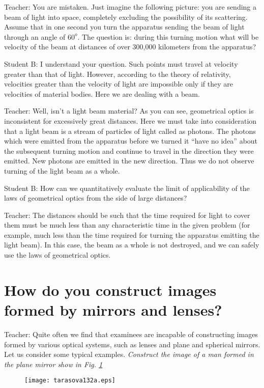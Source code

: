 \documentclass[a4paper,12pt]{book}
\begin{document}
{{\sc Teacher:} You are mistaken. Just imagine the following picture: you are sending a beam of light into space, completely excluding the possibility of its scattering. Assume that in one second you turn the apparatus sending the beam of light through an angle of $60^{o}$. The question is: during this turning motion what will be velocity of the beam at distances of over 300,000 kilometers from the apparatus?

{\sc Student B:} I understand your question. Such points must travel at velocity greater than that of light. However, according to the theory of relativity, velocities greater than the velocity of light are impossible only if they are velocities of material bodies. Here we are dealing with a beam.

{\sc Teacher:} Well, isn't a light beam material? As you can see, geometrical optics is inconsistent for excessively great distances. Here we must take into consideration that a light beam is a stream of particles of light called as photons. The photons which were emitted from the apparatus before we turned it ``have no idea'' about the subsequent turning motion and continue to travel in the direction they were emitted. New photons are emitted in the new direction. Thus we do not observe turning of the light beam as a whole. 

{\sc Student B:} How can we quantitatively evaluate the limit of applicability of the laws of geometrical optics from the side of large distances?

{\sc Teacher:} The distances should be such that the time required for light to cover them must be much less than any characteristic time in the given problem (for example, much less than the time required for turning the apparatus emitting the light beam). In this case, the beam as a whole is not destroyed, and we can safely use the laws of geometrical optics.



\section{How do you construct images formed by mirrors and lenses?}
{\sc Teacher:} Quite often we find that examinees are incapable of constructing images formed by various optical systems, such as lenses and plane and spherical mirrors. Let us consider some typical examples. \emph{Construct the image of a man formed in the plane mirror show in Fig. \ref{fig132a}}
\begin{figure}[htbp]
\begin{center}
\texttt{[image: tarasova132a.eps]}
\caption{}
\label{fig132a}
\end{center}
\end{figure}

}
\end{document}

